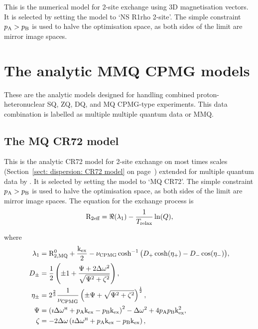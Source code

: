 This is the numerical model for 2-site exchange using 3D magnetisation vectors.
It is selected by setting the model to `NS R1rho 2-site'.
The simple constraint $p_\textrm{A} > p_\textrm{B}$ is used to halve the optimisation space, as both sides of the limit are mirror image spaces.




\section{The analytic MMQ CPMG models}
\label{sect: dispersion: analytic MMQ CPMG models}

These are the analytic models designed for handling combined proton-heteronuclear SQ, ZQ, DQ, and MQ CPMG-type experiments.
This data combination is labelled as multiple multiple quantum data or MMQ.



\subsection{The MQ CR72 model}
\label{sect: dispersion: MQ CR72 model}

This is the analytic CR72 model for 2-site exchange on most times scales (Section~\ref{sect: dispersion: CR72 model} on page~\pageref{sect: dispersion: CR72 model}) extended for multiple quantum data by \citet{Korzhnev04a}.
It is selected by setting the model to `MQ CR72'.
The simple constraint $p_\textrm{A} > p_\textrm{B}$ is used to halve the optimisation space, as both sides of the limit are mirror image spaces.
The equation for the exchange process is 
\begin{equation}
    \mathrm{R}_\textrm{2eff} = \Re(\lambda_1) - \frac{1}{T_\textrm{relax}}\ln(Q),
\end{equation}

where
\begin{align}
    \lambda_1 &= \mathrm{R}_\mathrm{2,MQ}^0 + \frac{\textrm{k}_\textrm{ex}}{2} - \nu_\textrm{CPMG}\cosh^{-1} \big( D_+\cosh(\eta_+) - D_-\cos(\eta_-) \big), \\
    D_\pm     &= \frac{1}{2} \left( \pm1 + \frac{\Psi + 2\Delta\omega^2}{\sqrt{\Psi^2 + \zeta^2}} \right) , \\
    \eta_\pm  &= 2^{\frac{2}{3}}\frac{1}{\nu_\textrm{CPMG}} \left( \pm\Psi + \sqrt{\Psi^2 + \zeta^2} \right)^{\frac{1}{2}} , \\
    \Psi      &= \left( \imath \Delta\omega^{\scriptscriptstyle\mathrm{H}} + p_\textrm{A}\textrm{k}_\textrm{ex} - p_\textrm{B}\textrm{k}_\textrm{ex} \right)^2 - \Delta\omega^2 + 4p_\textrm{A}p_\textrm{B}\textrm{k}_\textrm{ex}^2 , \\
    \zeta     &= -2\Delta\omega \left( \imath \Delta\omega^{\scriptscriptstyle\mathrm{H}} + p_\textrm{A}\textrm{k}_\textrm{ex} - p_\textrm{B}\textrm{k}_\textrm{ex} \right),
\end{align}

